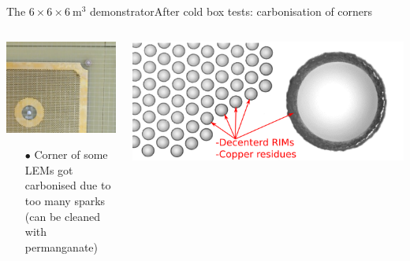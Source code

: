 \documentclass[10pt]{beamer}
\begin{document}
       \begin{frame}{The \texorpdfstring{$6 \times 6 \times \SI{6}{\meter\cubed}$}{666} demonstrator}{After cold box tests: carbonisation of corners}
	       	\begin{scriptsize}
	       		\begin{columns}
	       			\begin{column}{0.4\textwidth}
	       				\includegraphics[width=\textwidth]{figures/666/carbonisation.png}\\
	       				\vfill
	       				\begin{itemize}
	       					\item[$\bullet$] Corner of some LEMs got carbonised due to too many sparks\\
	       					(can be cleaned with permanganate)
	       				\end{itemize}
	       			\end{column}
	       			\hfill
	       			\begin{column}{0.6\textwidth}
	       				\includegraphics[width=\textwidth]{figures/666/decentered_rims.png}\\

\end{column}
\end{columns}
\end{scriptsize}
\end{frame}
\end{document}
